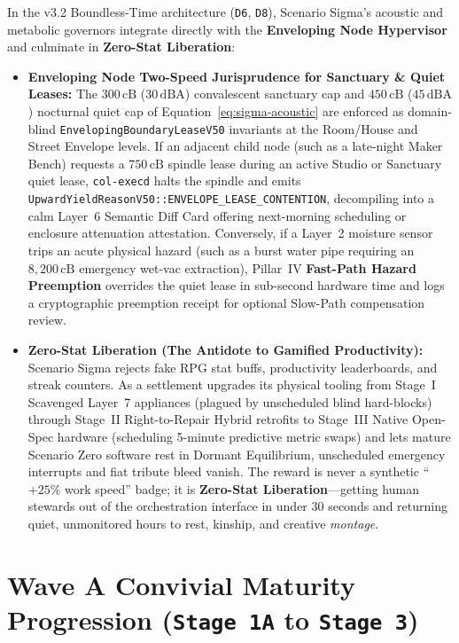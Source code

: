 In the v3.2 Boundless-Time architecture (\texttt{D6}, \texttt{D8}), Scenario Sigma's acoustic and metabolic governors
integrate directly with the \textbf{Enveloping Node Hypervisor} and culminate in \textbf{Zero-Stat Liberation}:
\begin{itemize}
    \item \textbf{Enveloping Node Two-Speed Jurisprudence for Sanctuary \& Quiet Leases:} The $300\,\mathrm{cB}$
    ($30\,\mathrm{dBA}$) convalescent sanctuary cap and $450\,\mathrm{cB}$ ($45\,\mathrm{dBA}$) nocturnal quiet cap of
    Equation~\eqref{eq:sigma-acoustic} are enforced as domain-blind \texttt{EnvelopingBoundaryLeaseV50} invariants at
    the Room/House and Street Envelope levels. If an adjacent child node (such as a late-night Maker Bench) requests a
    $750\,\mathrm{cB}$ spindle lease during an active Studio or Sanctuary quiet lease, \texttt{col-execd} halts the
    spindle and emits \texttt{UpwardYieldReasonV50::ENVELOPE\_LEASE\_CONTENTION}, decompiling into a calm Layer~6
    Semantic Diff Card offering next-morning scheduling or enclosure attenuation attestation. Conversely, if a Layer~2
    moisture sensor trips an acute physical hazard (such as a burst water pipe requiring an $8{,}200\,\mathrm{cB}$
    emergency wet-vac extraction), Pillar~IV \textbf{Fast-Path Hazard Preemption} overrides the quiet lease in
    sub-second hardware time and logs a cryptographic preemption receipt for optional Slow-Path compensation review.
    \item \textbf{Zero-Stat Liberation (The Antidote to Gamified Productivity):} Scenario Sigma rejects fake RPG stat
    buffs, productivity leaderboards, and streak counters. As a settlement upgrades its physical tooling from Stage~I
    Scavenged Layer~7 appliances (plagued by unscheduled blind hard-blocks) through Stage~II Right-to-Repair Hybrid
    retrofits to Stage~III Native Open-Spec hardware (scheduling 5-minute predictive metric swaps) and lets mature
    Scenario Zero software rest in Dormant Equilibrium, unscheduled emergency interrupts and fiat tribute bleed vanish.
    The reward is never a synthetic ``$+25\%$ work speed'' badge; it is \textbf{Zero-Stat Liberation}---getting human
    stewards out of the orchestration interface in under 30 seconds and returning quiet, unmonitored hours to rest,
    kinship, and creative \emph{montage}.
\end{itemize}

\section{Wave A Convivial Maturity Progression (\texttt{Stage 1A} to \texttt{Stage 3})}
\label{sec:wave-a-maturity}

